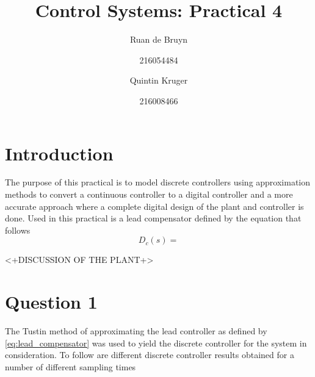 \documentclass[a4paper, 12pt]{article}
\title{Control Systems: Practical 4}
\author{Ruan de Bruyn \and 216054484 \and Quintin Kruger \and 216008466}
\begin{document}
\maketitle
\newpage
{}
\tableofcontents
\listoffigures
\newpage
{}

\section{Introduction} %
\label{sec:introduction}
The purpose of this practical is to model discrete controllers using approximation methods to convert a continuous controller to a digital controller  and a more accurate approach where a complete digital design of the plant and controller is done. Used in this practical is a lead compensator defined by the equation that follows
\begin{equation}
	\label{eq:lead_compensator}
	D_c(s) = 
\end{equation}

<+DISCUSSION OF THE PLANT+>

\section{Question 1} %
\label{sec:question_1}
The Tustin method of approximating the lead controller as defined by \eqref{eq:lead_compensator} was used to yield the discrete controller for the system in consideration. To follow are different discrete controller results obtained for a number of different sampling times 




\end{document}

